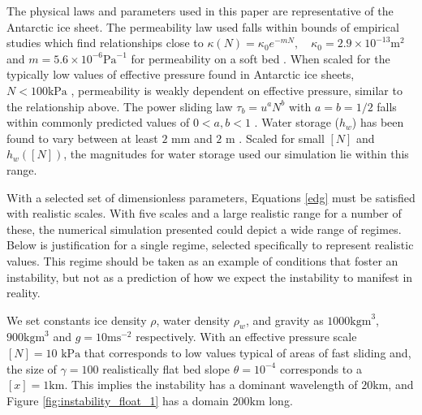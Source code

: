 \documentclass[journal abbreviation, manuscript]{copernicus}
\begin{document}

The physical laws and parameters used in this paper are representative of the Antarctic ice sheet. 
The permeability law used falls within bounds of empirical studies which find relationships close to  
$\kappa(N) = \kappa_0 e^ {-m N}, \quad  \kappa_0 = 2.9 \times 10^{-13} \mathrm{   m}^2$ and $m = 5.6 \times 10^{-6} \mathrm{  Pa}^{-1}$ for permeability on a soft bed \citep{boulton1974nature, mckinlay1975representative}. When scaled for the typically low values of effective pressure found in Antarctic ice sheets, $N<100 \mathrm{ kPa}$ \citep{engelhardt1997basal, alley2001west}, permeability is weakly dependent on effective pressure, similar to the relationship above. 
The power sliding law $ \tau_b = u^a N^b $ with $a=b=1/2$ falls within commonly predicted values of $0< a,b <1$ 
\citep{lliboutry1968general, budd1979empirical, bindschadler1983importance, fowler1986sliding, fowler1987sliding, boulton1987sediment, kamb1991rheological, iverson1998ring}.
Water storage ($h_w$) has been found to vary between at least $2 \mbox{ mm}$ \citep{engelhardt1997basal} 
and $2\mbox{ m}$ \citep{tulaczyk2000basal, engelhardt1990physical, kamb1991rheological}.
Scaled for small $[N]$ and $h_w([N])$, the magnitudes for water storage used our simulation lie within this range. 



With a selected set of dimensionless parameters, Equations \eqref{edg} must be satisfied with realistic scales. With five scales and a large realistic range for a number of these, the numerical simulation presented could depict a wide range of regimes. Below is justification for a single regime, selected specifically to represent realistic values. This regime should be taken as an example of conditions that foster an instability, but not as a prediction of how we expect the instability to manifest in reality.

We set constants ice density $\rho$, water density $\rho_w$, and gravity as $1000 \mbox{kgm}^3$, $900\mbox{kgm}^3$ and $g=10 \mbox{ms}^{-2}$ respectively. With an effective pressure scale $ [N]=10 \mbox{ kPa}$ that corresponds to low values typical of areas of fast sliding  \citep{engelhardt1997basal, alley2001west} and, the size of $\gamma=100$  realistically flat bed slope $\theta = 10^{-4}$  \citep{fretwell2013bedmap2} corresponds to a $[x]=1 \mbox{km}$.
This implies the instability has a dominant wavelength of $20 \mbox{km}$, and Figure \ref{fig:instability_float_1} has a domain $200 \mbox{km}$ long.
\end{document}
